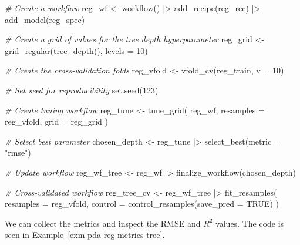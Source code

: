\documentclass[
  letterpaper,
]{latex/krantz}
\newenvironment{Shaded}{\begin{snugshade}}{\end{snugshade}}
\newcommand{\AttributeTok}[1]{\textcolor[rgb]{0.00,0.00,0.00}{#1}}
\newcommand{\CommentTok}[1]{\textcolor[rgb]{0.00,0.00,0.00}{\textit{#1}}}
\newcommand{\ConstantTok}[1]{\textcolor[rgb]{0.00,0.00,0.00}{#1}}
\newcommand{\DecValTok}[1]{\textcolor[rgb]{0.00,0.00,0.00}{#1}}
\newcommand{\FunctionTok}[1]{\textcolor[rgb]{0.00,0.00,0.00}{#1}}
\newcommand{\NormalTok}[1]{\textcolor[rgb]{0.00,0.00,0.00}{#1}}
\newcommand{\OtherTok}[1]{\textcolor[rgb]{0.00,0.00,0.00}{#1}}
\newcommand{\SpecialCharTok}[1]{\textcolor[rgb]{0.00,0.00,0.00}{#1}}
\newcommand{\StringTok}[1]{\textcolor[rgb]{0.00,0.00,0.00}{#1}}
\theoremstyle{definition}
\theoremstyle{remark}
\begin{document}
\begin{Shaded}
\begin{Highlighting}[]
\CommentTok{\# Create a workflow}
\NormalTok{reg\_wf }\OtherTok{\textless{}{-}}
  \FunctionTok{workflow}\NormalTok{() }\SpecialCharTok{|\textgreater{}}
  \FunctionTok{add\_recipe}\NormalTok{(reg\_rec) }\SpecialCharTok{|\textgreater{}}
  \FunctionTok{add\_model}\NormalTok{(reg\_spec)}

\CommentTok{\# Create a grid of values for the tree depth hyperparameter}
\NormalTok{reg\_grid }\OtherTok{\textless{}{-}}
  \FunctionTok{grid\_regular}\NormalTok{(}\FunctionTok{tree\_depth}\NormalTok{(), }\AttributeTok{levels =} \DecValTok{10}\NormalTok{)}

\CommentTok{\# Create the cross{-}validation folds}
\NormalTok{reg\_vfold }\OtherTok{\textless{}{-}} \FunctionTok{vfold\_cv}\NormalTok{(reg\_train, }\AttributeTok{v =} \DecValTok{10}\NormalTok{)}

\CommentTok{\# Set seed for reproducibility}
\FunctionTok{set.seed}\NormalTok{(}\DecValTok{123}\NormalTok{)}

\CommentTok{\# Create tuning workflow}
\NormalTok{reg\_tune }\OtherTok{\textless{}{-}}
  \FunctionTok{tune\_grid}\NormalTok{(}
\NormalTok{    reg\_wf,}
    \AttributeTok{resamples =}\NormalTok{ reg\_vfold,}
    \AttributeTok{grid =}\NormalTok{ reg\_grid}
\NormalTok{  )}

\CommentTok{\# Select best parameter}
\NormalTok{chosen\_depth }\OtherTok{\textless{}{-}}\NormalTok{ reg\_tune }\SpecialCharTok{|\textgreater{}} \FunctionTok{select\_best}\NormalTok{(}\AttributeTok{metric =} \StringTok{"rmse"}\NormalTok{)}

\CommentTok{\# Update workflow}
\NormalTok{reg\_wf\_tree }\OtherTok{\textless{}{-}}
\NormalTok{  reg\_wf }\SpecialCharTok{|\textgreater{}}
  \FunctionTok{finalize\_workflow}\NormalTok{(chosen\_depth)}

\CommentTok{\# Cross{-}validated workflow}
\NormalTok{reg\_tree\_cv }\OtherTok{\textless{}{-}}
\NormalTok{  reg\_wf\_tree }\SpecialCharTok{|\textgreater{}}
  \FunctionTok{fit\_resamples}\NormalTok{(}
    \AttributeTok{resamples =}\NormalTok{ reg\_vfold,}
    \AttributeTok{control =} \FunctionTok{control\_resamples}\NormalTok{(}\AttributeTok{save\_pred =} \ConstantTok{TRUE}\NormalTok{)}
\NormalTok{  )}
\end{Highlighting}
\end{Shaded}

We can collect the metrics and inspect the RMSE and \(R^2\) values. The
code is seen in Example~\ref{exm-pda-reg-metrics-tree}.
\end{document}
